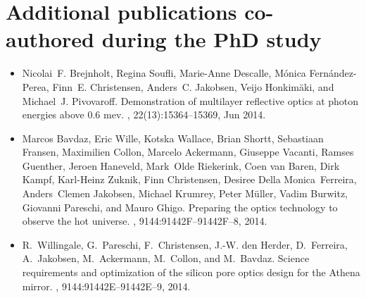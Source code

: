 \section*{Additional publications co-authored during the PhD study}

%
%
%
\begin{itemize}

\item
Nicolai~F. Brejnholt, Regina Soufli, Marie-Anne Descalle, M\'{o}nica
  Fern\'{a}ndez-Perea, Finn~E. Christensen, Anders~C. Jakobsen, Veijo
  Honkim\"{a}ki, and Michael~J. Pivovaroff.
\newblock Demonstration of multilayer reflective optics at photon energies
  above 0.6 mev.
, 22(13):15364--15369, Jun 2014.

\item
Marcos Bavdaz, Eric Wille, Kotska Wallace, Brian Shortt, Sebastiaan Fransen,
  Maximilien Collon, Marcelo Ackermann, Giuseppe Vacanti, Ramses Guenther,
  Jeroen Haneveld, Mark~Olde Riekerink, Coen van Baren, Dirk Kampf, Karl-Heinz
  Zuknik, Finn Christensen, Desiree Della Monica~Ferreira, Anders~Clemen
  Jakobsen, Michael Krumrey, Peter M\"{u}ller, Vadim Burwitz, Giovanni
  Pareschi, and Mauro Ghigo.
\newblock Preparing the optics technology to observe the hot universe.
, 9144:91442F--91442F--8, 2014.

\item
R.~Willingale, G.~Pareschi, F.~Christensen, J.-W. den Herder, D.~Ferreira,
  A.~Jakobsen, M.~Ackermann, M.~Collon, and M.~Bavdaz.
\newblock Science requirements and optimization of the silicon pore optics
  design for the Athena mirror.
, 9144:91442E--91442E--9, 2014.


\end{itemize}
